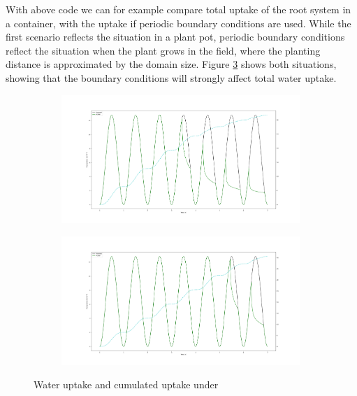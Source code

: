 With above code we can for example compare total uptake of the root system in a container, with the uptake if periodic boundary conditions are used. While the first scenario reflects the situation in a plant pot, periodic boundary conditions reflect the situation when the plant grows in the field, where the planting distance is approximated by the domain size. Figure \ref{fig:uptake} shows both situations, showing that the boundary conditions will strongly affect total water uptake. 

\begin{figure}
\begin{subfigure}[c]{0.5\textwidth}
\includegraphics[width=0.99\textwidth]{Figure6c.png}
 \label{fig:uptake_confined}
\end{subfigure}
\begin{subfigure}[c]{0.5\textwidth}
\includegraphics[width=0.99\textwidth]{Figure6c_periodic.png}
 \label{fig:uptake_peridodic}
\end{subfigure}
\caption{Water uptake and cumulated uptake under} \label{fig:uptake}
\end{figure}



